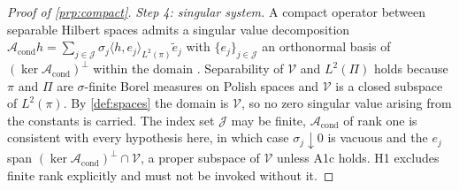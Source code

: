 \begin{proof}[Proof of \cref{prp:compact}]
\emph{Step 4: singular system.}
A compact operator between separable Hilbert spaces admits a singular value decomposition
$\mathcal A_{\mathrm{cond}}h=\sum_{j\in\mathcal J}\sigma_j\langle h,e_j\rangle_{L^{2}(\pi)}\tilde e_j$
with $\{e_j\}_{j\in\mathcal J}$ an orthonormal basis of $(\ker\mathcal A_{\mathrm{cond}})^{\perp}$ within
the domain \citep[Ch.~2]{engl2000}. Separability of $\mathcal V$ and $L^{2}(\Pi)$ holds because $\pi$ and
$\Pi$ are $\sigma$-finite Borel measures on Polish spaces and $\mathcal V$ is a closed subspace of
$L^{2}(\pi)$. By \cref{def:spaces} the domain is $\mathcal V$, so no zero singular value arising from the
constants is carried. The index set $\mathcal J$ may be finite, $\mathcal A_{\mathrm{cond}}$ of rank
one is consistent with every hypothesis here, in which case $\sigma_j\downarrow0$ is vacuous and the
$e_j$ span $(\ker\mathcal A_{\mathrm{cond}})^{\perp}\cap\mathcal V$, a proper subspace of $\mathcal V$
unless A1c holds. H1 excludes finite rank explicitly and must not be invoked without it.
\end{proof}


